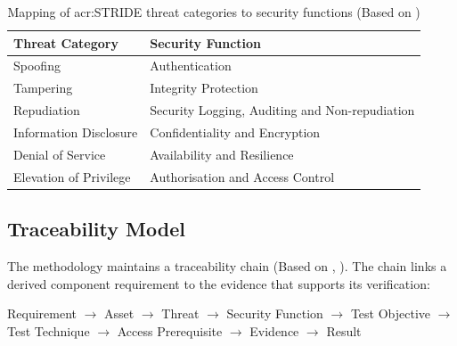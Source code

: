 \begin{table}[H] 
	\caption[Mapping of \gls{acr:STRIDE} threat categories to security functions]{Mapping of \gls{acr:STRIDE} threat categories to security functions (Based on \cite{owasp_threat_modeling_process} \cite{softguide_security_functions})} 
	\label{tab:threat_function} 
	\centering 
	\begin{tabular}{p{} p{} } 
		\toprule \textbf{Threat Category} & \textbf{Security Function} \\ 
		\midrule 
		Spoofing & Authentication \\ 
		Tampering & Integrity Protection \\ 
		Repudiation & Security Logging, Auditing and Non-repudiation \\ 
		Information Disclosure & Confidentiality and Encryption \\ 
		Denial of Service & Availability and Resilience \\ 
		Elevation of Privilege & Authorisation and Access Control \\ 
		\bottomrule 
	\end{tabular} 
\end{table}


\subsection{Traceability Model} 
\label{subsec:traceability_model} 

The methodology maintains a traceability chain (Based on \cite[p. 36]{DIN_EN_ISO_IEC_15408_1_2024}, \cite[p. 82]{1341418} \cite[p. 21]{DIN_EN_IEC_62443_4_1_2018}). The chain links a derived component requirement to the evidence that supports its verification: 

\begin{center} 
	Requirement $\rightarrow$ Asset $\rightarrow$ Threat $\rightarrow$ Security Function $\rightarrow$ Test Objective $\rightarrow$ Test Technique $\rightarrow$ Access Prerequisite $\rightarrow$ Evidence $\rightarrow$ Result 
\end{center} 

